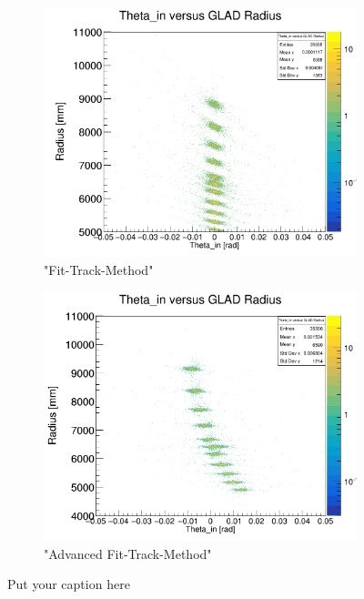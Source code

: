 \documentclass[12pt, letterpaper]{article}
\begin{document}
\begin{figure}[!htbp]
\begin{subfigure}{.5\textwidth}
\end{subfigure}
\begin{subfigure}{.5\textwidth}
  \centering
  \includegraphics[width=.9\linewidth]{plot_imgs/theta_in_rho_fit.png} 
  \caption{"Fit-Track-Method"}
  \label{fig:sub-second}
\end{subfigure}
\begin{subfigure}{.5\textwidth}
  \centering
  \includegraphics[width=.9\linewidth]{plot_imgs/theta_in_rho_last.png} 
  \caption{"Advanced Fit-Track-Method"}
  \label{fig:sub-second}
\end{subfigure}
\caption{Put your caption here}
\label{fig:fig}
\end{figure}
\FloatBarrier
\clearpage
\end{document}
